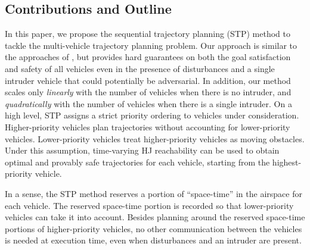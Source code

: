 \subsection{Contributions and Outline}
In this paper, we propose the sequential trajectory planning (STP) method to tackle the multi-vehicle trajectory planning problem. 
Our approach is similar to the approaches of \cite{Erdmann1987, VandenBerg2005}, but provides hard guarantees on both the goal satisfaction and safety of all vehicles even in the presence of disturbances and a single intruder vehicle that could potentially be adversarial. 
In addition, our method scales only \textit{linearly} with the number of vehicles when there is no intruder, and \textit{quadratically} with the number of vehicles when there is a single intruder.
On a high level, STP assigns a strict priority ordering to vehicles under consideration. 
Higher-priority vehicles plan trajectories without accounting for lower-priority vehicles. 
Lower-priority vehicles treat higher-priority vehicles as moving obstacles. 
Under this assumption, time-varying HJ reachability \cite{Bokanowski11, Fisac15} can be used to obtain optimal and provably safe trajectories for each vehicle, starting from the highest-priority vehicle. 

In a sense, the STP method reserves a portion of ``space-time'' in the airspace for each vehicle. The reserved space-time portion is recorded so that lower-priority vehicles can take it into account. Besides planning around the reserved space-time portions of higher-priority vehicles, no other communication between the vehicles is needed at execution time, even when disturbances and an intruder are present. 


